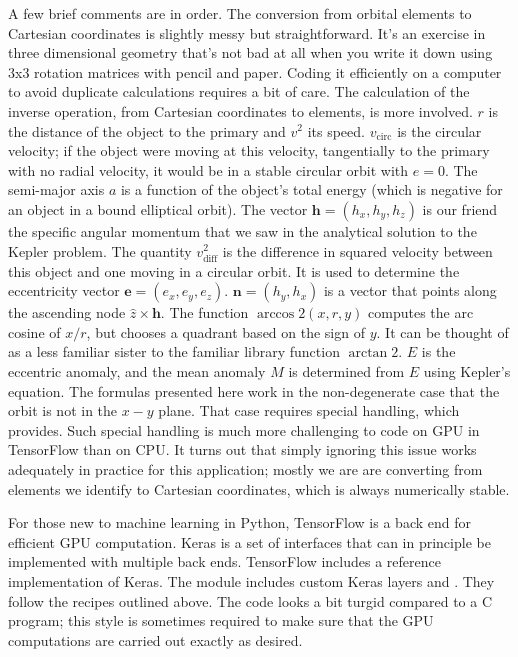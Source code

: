 A few brief comments are in order.
The conversion from orbital elements to Cartesian coordinates is slightly messy but straightforward.
It's an exercise in three dimensional geometry that's not bad at all when you write it down using 3x3 rotation matrices with pencil and paper.
Coding it efficiently on a computer to avoid duplicate calculations requires a bit of care.
The calculation of the inverse operation, from Cartesian coordinates to elements, is more involved.
$r$ is the distance of the object to the primary and $v^2$ its speed.
$v_{\mathrm{circ}}$ is the circular velocity; if the object were moving at this velocity, 
tangentially to the primary with no radial velocity, it would be in a stable circular orbit with $e=0$.
The semi-major axis $a$ is a function of the object's total energy (which is negative for an object in a bound elliptical orbit).
The vector $\mathbf{h} = (h_x, h_y, h_z)$ is our friend the specific angular momentum that we saw in the analytical solution to the Kepler problem.
The quantity $v^2_{\mathrm{diff}}$ is the difference in squared velocity between this object and one moving in a circular orbit.
It is used to determine the eccentricity vector $\mathbf{e} = (e_x, e_y, e_z)$.
$\mathbf{n} = (h_y, h_x)$ is a vector that points along the ascending node $\hat{z} \times \mathbf{h}$.
The function $\arccos2(x, r, y)$ computes the arc cosine of $x / r$, but chooses a quadrant based on the sign of $y$.
It can be thought of as a less familiar sister to the familiar library function $\arctan2$.
$E$ is the eccentric anomaly, and the mean anomaly $M$ is determined from $E$ using Kepler's equation.
The formulas presented here work in the non-degenerate case that the orbit is not in the $x-y$ plane.
That case requires special handling, which  provides.
Such special handling is much more challenging to code on GPU in TensorFlow than on CPU.
It turns out that simply ignoring this issue works adequately in practice for this application;
mostly we are are converting from elements we identify to Cartesian coordinates, which is always numerically stable.

For those new to machine learning in Python, TensorFlow is a back end for efficient GPU computation.
Keras is a set of interfaces that can in principle be implemented with multiple back ends.
TensorFlow includes a reference implementation of Keras.
The module  includes custom Keras layers  and .
They follow the recipes outlined above.  
The code looks a bit turgid compared to a C program; 
this style is sometimes required to make sure that the GPU computations are carried out exactly as desired.

